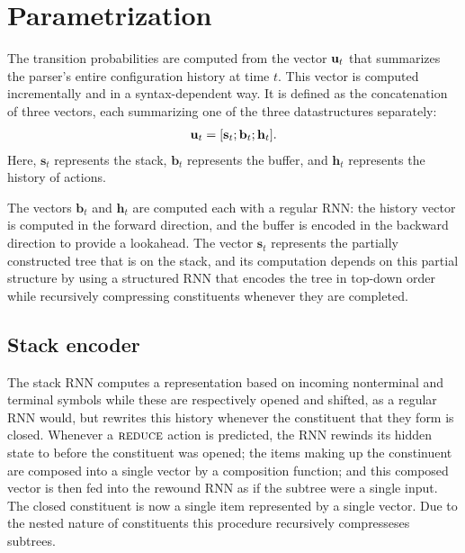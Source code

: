 \section{Parametrization}
  The transition probabilities are computed from the vector $\mathbf{u}_t$ that summarizes the parser's entire configuration history at time $t$. This vector is computed incrementally and in a syntax-dependent way. It is defined as the concatenation of three vectors, each summarizing one of the three datastructures separately:
  \begin{align*}
    \mathbf{u}_t = [\mathbf{s}_t; \mathbf{b}_t; \mathbf{h}_t].
  \end{align*}
  Here, $\mathbf{s}_t$ represents the stack, $\mathbf{b}_t$ represents the buffer, and $\mathbf{h}_t$ represents the history of actions.

  The vectors $\mathbf{b}_t$ and $\mathbf{h}_t$ are computed each with a regular RNN: the history vector is computed in the forward direction, and the buffer is encoded in the backward direction to provide a lookahead. The vector $\mathbf{s}_t$ represents the partially constructed tree that is on the stack, and its computation depends on this partial structure by using a structured RNN that encodes the tree in top-down order while recursively compressing constituents whenever they are completed.

  \subsection{Stack encoder}
    The stack RNN computes a representation based on incoming nonterminal and terminal symbols while these are respectively opened and shifted, as a regular RNN would, but rewrites this history whenever the constituent that they form is closed. Whenever a $\textsc{reduce}$ action is predicted, the RNN rewinds its hidden state to before the constituent was opened; the items making up the constinuent are composed into a single vector by a composition function; and this composed vector is then fed into the rewound RNN as if the subtree were a single input. The closed constituent is now a single item represented by a single vector. Due to the nested nature of constituents this procedure recursively compresseses subtrees.

